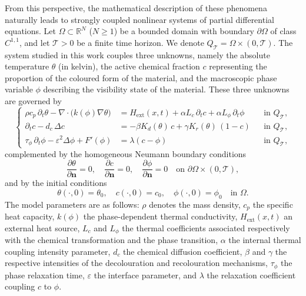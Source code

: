 \documentclass[final,1p,times]{elsarticle}
\numberwithin{equation}{section}
\newcommand{\R}{\mathbb{R}}
\newcommand{\QT}{Q_{\mathcal{T}}}
\newcommand{\ptn}{\partial_t}
\begin{document}
	From this perspective, the mathematical description of these phenomena naturally leads to strongly coupled nonlinear systems of partial differential equations. Let $\Omega \subset \R^N$ ($N \geq 1$) be a bounded domain with boundary $\partial\Omega$ of class $C^{1,1}$, and let $\mathcal{T} > 0$ be a finite time horizon. We denote $\QT = \Omega \times (0,\mathcal{T})$. The system studied in this work couples three unknowns, namely the absolute temperature $\theta$ (in kelvin), the active chemical fraction $c$ representing the proportion of the coloured form of the material, and the macroscopic phase variable $\phi$ describing the visibility state of the material. These three unknowns are governed by
	\begin{equation}
		\label{eq:sys}
		\left\{
		\begin{aligned}
			\rho c_p\,\ptn\theta - \nabla\cdot\bigl(k(\phi)\nabla\theta\bigr)
			&= H_{\mathrm{ext}}(x,t) + \alpha L_c\,\ptn c + \alpha L_\phi\,\ptn\phi
			&& \text{in } \QT, \\[4pt]
			\ptn c - d_c\,\Delta c
			&= -\beta K_d(\theta)\,c + \gamma K_r(\theta)\,(1-c)
			&& \text{in } \QT, \\[4pt]
			\tau_\phi\,\ptn\phi - \varepsilon^2\Delta\phi + F'(\phi)
			&= \lambda(c-\phi)
			&& \text{in } \QT,
		\end{aligned}
		\right.
	\end{equation}
	complemented by the homogeneous Neumann boundary conditions
	\begin{equation}
		\label{eq:Neumann}
		\frac{\partial\theta}{\partial\mathbf{n}} = 0,\quad
		\frac{\partial c}{\partial\mathbf{n}} = 0,\quad
		\frac{\partial\phi}{\partial\mathbf{n}} = 0
		\quad\text{on } \partial\Omega\times(0,\mathcal{T}),
	\end{equation}
	and by the initial conditions
	\begin{equation}
		\label{eq:CI}
		\theta(\cdot,0) = \theta_0,\quad
		c(\cdot,0) = c_0,\quad
		\phi(\cdot,0) = \phi_0
		\quad\text{in } \Omega.
	\end{equation}
	The model parameters are as follows: $\rho$ denotes the mass density, $c_p$ the specific heat capacity, $k(\phi)$ the phase-dependent thermal conductivity, $H_{\mathrm{ext}}(x,t)$ an external heat source, $L_c$ and $L_\phi$ the thermal coefficients associated respectively with the chemical transformation and the phase transition, $\alpha$ the internal thermal coupling intensity parameter, $d_c$ the chemical diffusion coefficient, $\beta$ and $\gamma$ the respective intensities of the decolouration and recolouration mechanisms, $\tau_\phi$ the phase relaxation time, $\varepsilon$ the interface parameter, and $\lambda$ the relaxation coefficient coupling $c$ to $\phi$.
	
\end{document}
